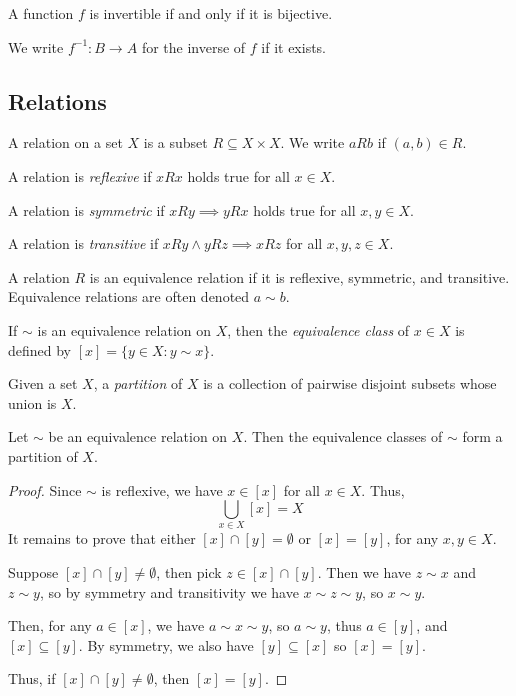 \documentclass[12pt]{article}
\begin{document}
\begin{corollary}
    A function $f$ is invertible if and only if it is bijective.
\end{corollary}

We write $f^{-1} : B \to A$ for the inverse of $f$ if it exists.

\subsection{Relations}
\begin{definition}
    A relation on a set $X$ is a subset $R \subseteq X \times X$.
    We write $aRb$ if $(a,b) \in R$.
\end{definition}

\begin{definition}
    A relation is \emph{reflexive} if $xRx$ holds true for all $x \in X$.
\end{definition}
\begin{definition}
    A relation is \emph{symmetric} if $xRy \implies yRx$ holds true for all $x,y \in X$.
\end{definition}
\begin{definition}
    A relation is \emph{transitive} if $xRy \land yRz \implies xRz$ for all $x,y,z \in X$.
\end{definition}

\begin{definition}
    A relation $R$ is an equivalence relation if it is
    reflexive, symmetric, and transitive.
    Equivalence relations are often denoted $a \sim b$.
\end{definition}

If $\sim$ is an equivalence relation on $X$, then 
the \emph{equivalence class} of $x \in X$ is
defined by $[x] = \{y \in X : y \sim x\}$.

Given a set $X$, a \emph{partition} of $X$ is
a collection of pairwise disjoint subsets
whose union is $X$.

\begin{theorem}
    Let $\sim$ be an equivalence relation on $X$.
    Then the equivalence classes of $\sim$ form a partition of $X$.
\end{theorem}
\begin{proof}
    Since $\sim$ is reflexive, we have $x \in [x]$ for all $x \in X$.
    Thus,
    \[
        \bigcup_{x \in X}[x] = X
    \]
    It remains to prove that either $[x] \cap [y] = \emptyset$ or $[x] = [y]$,
    for any $x,y \in X$.

    Suppose $[x] \cap [y] \ne \emptyset$, then pick $z \in [x] \cap [y]$.
    Then we have $z \sim x$ and $z \sim y$, so by symmetry and transitivity
    we have $x \sim z \sim y$, so $x \sim y$.

    Then, for any $a \in [x]$, we have $a \sim x \sim y$, so $a \sim y$,
    thus $a \in [y]$, and $[x] \subseteq [y]$. By symmetry,
    we also have $[y] \subseteq [x]$ so $[x] = [y]$.

    Thus, if $[x] \cap [y] \ne \emptyset$, then $[x] = [y]$.
\end{proof}
\end{document}
